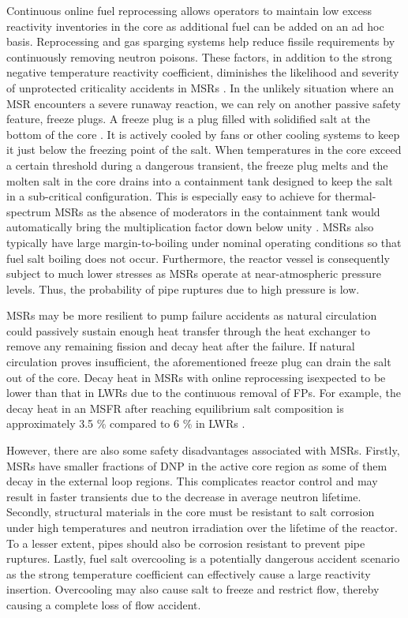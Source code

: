 Continuous online fuel reprocessing allows operators to maintain low excess
reactivity inventories in the core as additional fuel can be added on an ad
hoc basis. Reprocessing and gas sparging systems help reduce fissile
requirements by continuously removing neutron poisons. These factors, in
addition to the strong negative temperature
reactivity coefficient, diminishes the likelihood and severity of unprotected
criticality accidents in \glspl{MSR} \cite{elsheikh_safety_2013}. In the
unlikely situation where an \gls{MSR} encounters a severe runaway reaction,
we can rely on another passive safety feature, freeze plugs. A freeze plug is
a plug filled with solidified salt at the bottom of the core
\cite{elsheikh_safety_2013}. It is actively
cooled by fans or other cooling systems to keep it just below the freezing
point of the salt. When temperatures in the core exceed a certain threshold
during a dangerous transient, the freeze plug melts and the molten salt in the
core drains into a containment tank designed to keep the salt in a
sub-critical configuration. This is especially easy to achieve for
thermal-spectrum \glspl{MSR} as the absence of moderators in the containment
tank would automatically bring the multiplication factor down below unity
\cite{elsheikh_safety_2013}. \glspl{MSR} also typically have large
margin-to-boiling under nominal operating conditions so that fuel salt boiling
does not occur. Furthermore, the reactor vessel is consequently subject to
much lower stresses as \glspl{MSR} operate at near-atmospheric pressure
levels. Thus, the probability of pipe ruptures due to high pressure is low.

\glspl{MSR} may be more resilient to pump failure accidents as natural
circulation could passively sustain enough heat transfer through the heat
exchanger to remove any remaining fission and decay heat after the failure. If
natural circulation proves insufficient, the aforementioned freeze plug can
drain the salt out of the core. Decay heat in \glspl{MSR} with online
reprocessing isexpected to be lower than that in \glspl{LWR} due to the
continuous removal of \glspl{FP}. For example, the decay heat in an \gls{MSFR}
after reaching equilibrium salt composition is approximately 3.5 \% compared
to 6 \% in \glspl{LWR} \cite{brovchenko_design-related_2013}.

However, there are also some safety disadvantages associated with \glspl{MSR}.
Firstly, \glspl{MSR} have smaller fractions of \gls{DNP} in the active core
region as some of them decay in the external loop regions. This complicates
reactor control and may result in faster transients due to the decrease in
average neutron lifetime. Secondly, structural materials in the core must be
resistant to salt corrosion under high temperatures and neutron irradiation
over the lifetime of the reactor. To a lesser extent, pipes should also be
corrosion resistant to prevent pipe ruptures. Lastly, fuel salt overcooling is
a potentially dangerous accident scenario as the strong temperature
coefficient can effectively cause a large reactivity insertion. Overcooling
may also cause salt to freeze and restrict flow, thereby causing a complete
loss of flow accident.

